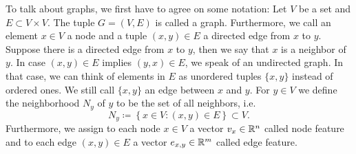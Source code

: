 To talk about graphs, we first have to agree on some notation: Let $V$ be a set and $E\subset V\times V$. The tuple $G=(V,E)$ is called a graph. Furthermore, we call an element $x\in V$ a node and a tuple 
$(x, y)\in E$ a directed edge from $x$ to $y$. Suppose there is a directed edge from $x$ to $y$, then we say that $x$ is a neighbor of $y$. 
In case $(x,y)\in E$ implies $(y,x)\in E$, we speak of an undirected graph.
In that case, we can think of elements in $E$ as unordered tuples $\{x,y\}$ instead of ordered ones. We still call $\{x,y\}$ an edge between $x$ and $y$.
For $y\in V$ we define the neighborhood $N_y$ of $y$ to be the set of all neighbors, i.e.
\begin{equation}
    \label{eq:def_neighbors}
    N_y\coloneq\left\{x\in V : (x,y)\in E\right\}\subset V.
\end{equation}
Furthermore, we assign to each node $x\in V$ a vector $v_x\in\mathbb{R}^n$ called node feature and to each edge $(x, y)\in E$ a vector $e_{x,y}\in\mathbb{R}^m$ called edge feature. 

